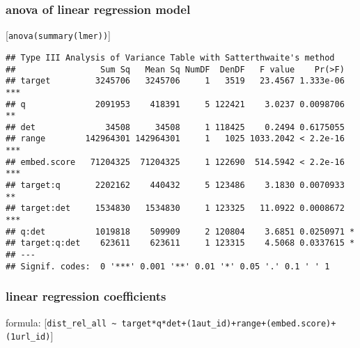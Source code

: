 \documentclass[
  12pt,
  oneside]{book}
\begin{document}
\subsubsection{anova of linear regression model}\label{anova-of-linear-regression-model-2}

{[}\texttt{anova(summary(lmer))}{]}

\begin{verbatim}
## Type III Analysis of Variance Table with Satterthwaite's method
##                 Sum Sq   Mean Sq NumDF  DenDF   F value    Pr(>F)    
## target         3245706   3245706     1   3519   23.4567 1.333e-06 ***
## q              2091953    418391     5 122421    3.0237 0.0098706 ** 
## det              34508     34508     1 118425    0.2494 0.6175055    
## range        142964301 142964301     1   1025 1033.2042 < 2.2e-16 ***
## embed.score   71204325  71204325     1 122690  514.5942 < 2.2e-16 ***
## target:q       2202162    440432     5 123486    3.1830 0.0070933 ** 
## target:det     1534830   1534830     1 123325   11.0922 0.0008672 ***
## q:det          1019818    509909     2 120804    3.6851 0.0250971 *  
## target:q:det    623611    623611     1 123315    4.5068 0.0337615 *  
## ---
## Signif. codes:  0 '***' 0.001 '**' 0.01 '*' 0.05 '.' 0.1 ' ' 1
\end{verbatim}

\subsubsection{linear regression coefficients}\label{linear-regression-coefficients-2}

formula: {[}\texttt{dist\_rel\_all\ \textasciitilde{}\ target*q*det+(1\textbar{}aut\_id)+range+(embed.score)+(1\textbar{}url\_id)}{]}
\end{document}
